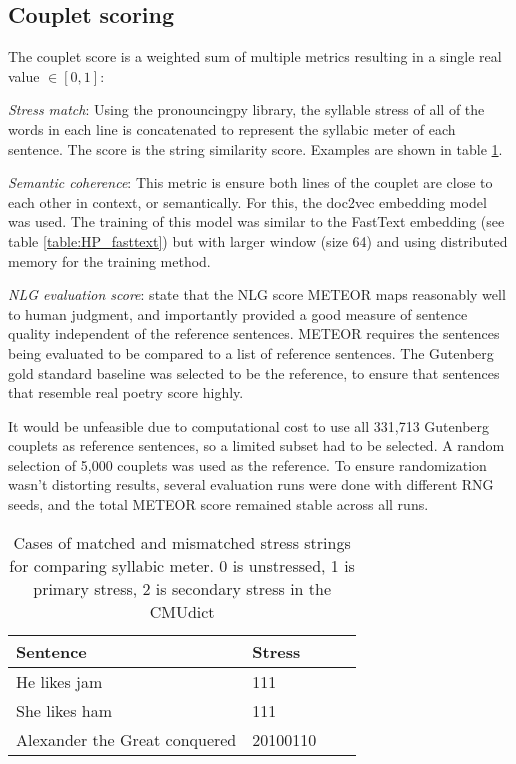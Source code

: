 \documentclass[11pt,a4paper]{article}
\newenvironment{tight_itemize}{
\begin{itemize}
\setlength{\itemsep}{0pt}
\setlength{\parskip}{0pt}
}{\end{itemize}}
\begin{document}
\subsection{Couplet scoring}
\label{sec:coupletscore}
The couplet score is a weighted sum of multiple metrics resulting in a single real value $\in [0, 1]$:
\begin{tight_itemize}
	\vspace{-0.5em}
\item \textit{Stress match}: Using the pronouncingpy library, the syllable stress of all of the words in each line is concatenated to represent the syllabic meter \cite{meter_def} of each sentence. The score is the \citet{ratcliff} string similarity score. Examples are shown in table \ref{table:stress}.
	\item \textit{Semantic coherence}: This metric is ensure both lines of the couplet are close to each other in context, or semantically. For this, the doc2vec embedding model \cite{docvec} was used. The training of this model was similar to the FastText embedding (see table \ref{table:HP_fasttext}) but with larger window (size 64) and using distributed memory for the training method.
	\item \textit{NLG evaluation score}: \citet{nlgeval} state that the NLG score METEOR \cite{meteor} maps reasonably well to human judgment, and importantly provided a good measure of sentence quality independent of the reference sentences. METEOR requires the sentences being evaluated to be compared to a list of reference sentences. The Gutenberg gold standard baseline was selected to be the reference, to ensure that sentences that resemble real poetry score highly.

		It would be unfeasible due to computational cost to use all 331,713 Gutenberg couplets as reference sentences, so a limited subset had to be selected. A random selection of 5,000 couplets was used as the reference. To ensure randomization wasn't distorting results, several evaluation runs were done with different RNG seeds, and the total METEOR score remained stable across all runs.
\end{tight_itemize}

\begin{table}
\centering
\begin{tabular}{ll c c}
	\hline\hline
	Sentence & Stress \\ [0.5ex]
	\hline\hline
	He likes jam & 111 \\ [0.5ex]
	\hline
	She likes ham & 111 \\ [0.5ex]
	\hline
	Alexander the Great conquered & 20100110 \\ [0.5ex]
	\hline
\end{tabular}
\caption{Cases of matched and mismatched stress strings for comparing syllabic meter. 0 is unstressed, 1 is primary stress, 2 is secondary stress in the CMUdict}
\label{table:stress}
\end{table}
\end{document}
